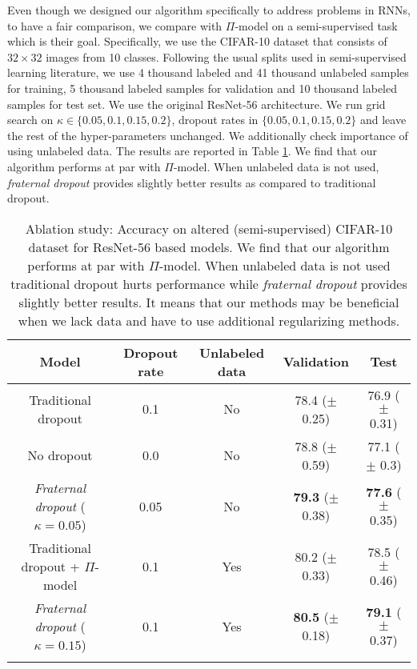 \documentclass{article} \usepackage{iclr2018_conference,times}
\begin{document}
Even though we designed our algorithm specifically to address problems in RNNs, to have a fair comparison, we compare with $\Pi$-model on a semi-supervised task which is their goal. Specifically, we use the CIFAR-10 dataset that consists of $32 \times 32$ images from 10 classes. Following the usual splits used in semi-supervised learning literature, we use 4 thousand labeled and 41 thousand unlabeled samples for training, 5 thousand labeled samples for validation and 10 thousand labeled samples for test set. We use the original ResNet-56 \citep{DBLP:journals/corr/HeZRS15} architecture. We run grid search on $\kappa \in \{0.05, 0.1, 0.15, 0.2\}$, dropout rates in $\{0.05, 0.1, 0.15, 0.2\}$ and leave the rest of the hyper-parameters unchanged. We additionally check importance of using unlabeled data. The results are reported in Table \ref{table:CIFAR-10}. We find that our algorithm performs at par with $\Pi$-model. When unlabeled data is not used, \emph{fraternal dropout} provides slightly better results as compared to traditional dropout.

\begin{table}[t]
\vspace{-0.08cm}
\centering
\begin{tabular}{c | c c c c} 
\textbf{Model} & \textbf{Dropout rate} & \textbf{Unlabeled data} & \textbf{Validation} & \textbf{Test}\\
\hline
Traditional dropout & 0.1 & No & 78.4 ($\pm$ 0.25) & 76.9 ($\pm$ 0.31)\\
No dropout & 0.0 & No & 78.8 ($\pm$ 0.59) & 77.1 ($\pm$ 0.3)\\
\emph{Fraternal dropout} ($\kappa=0.05$)& 0.05 & No &  \textbf{79.3} ($\pm$ 0.38) & \textbf{77.6} ($\pm$ 0.35)\\
\hline
Traditional dropout + $\Pi$-model & 0.1 & Yes & 80.2 ($\pm$ 0.33) & 78.5 ($\pm$ 0.46)\\
\emph{Fraternal dropout} ($\kappa=0.15$) & 0.1 & Yes & \textbf{80.5} ($\pm$ 0.18) & \textbf{79.1} ($\pm$ 0.37)\\
\vspace{-0.08cm}
\end{tabular}
\caption{Ablation study: Accuracy on altered (semi-supervised) CIFAR-10 dataset for ResNet-56 based models. We find that our algorithm performs at par with $\Pi$-model. When unlabeled data is not used traditional dropout hurts performance while \emph{fraternal dropout} provides slightly better results. It means that our methods may be beneficial when we lack data and have to use additional regularizing methods.}
\label{table:CIFAR-10}
\end{table}
\end{document}
